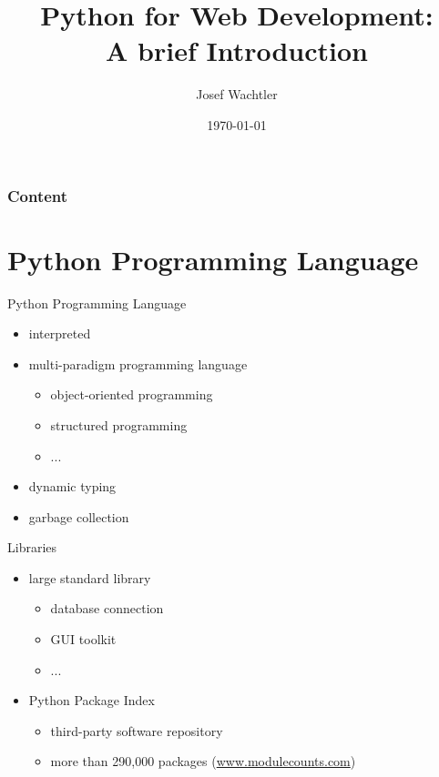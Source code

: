 \documentclass{beamer}
\title{Python for Web Development: \\A brief Introduction}
\date{\today}
\author{Josef Wachtler}
\institute{Educational Technology, Graz University of Technology}
\begin{document}

\maketitle


\begin{frame}
  \frametitle{Content}
  \tableofcontents%
\end{frame}



\section{Python Programming Language}


\begin{frame}{Python Programming Language}
 
  \begin{itemize}
    \item interpreted
    \item multi-paradigm programming language
    \begin{itemize}
      \item object-oriented programming
      \item structured programming
      \item ...
    \end{itemize}
    \item dynamic typing
    \item garbage collection
  \end{itemize}
  
\end{frame}


\begin{frame}{Libraries}
 
  \begin{itemize}
    \item large standard library
    \begin{itemize}
      \item database connection
      \item GUI toolkit
      \item ...
    \end{itemize}
    \item Python Package Index
    \begin{itemize}
      \item third-party software repository
      \item more than 290,000 packages 
        (\href{http://www.modulecounts.com/}{www.modulecounts.com})
    \end{itemize}
  \end{itemize}
  
\end{frame}
\end{document}
